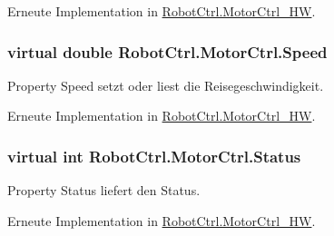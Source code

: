 Erneute Implementation in \hyperlink{class_robot_ctrl_1_1_motor_ctrl___h_w_aa5f0c2dd90cf577ef951e58e957976c9}{RobotCtrl.MotorCtrl\_\-HW}.

\hypertarget{class_robot_ctrl_1_1_motor_ctrl_a13a5a1ee7896d0557c58ba617af60029}{
\subsubsection[{Speed}]{\setlength{\rightskip}{0pt plus 5cm}virtual double RobotCtrl.MotorCtrl.Speed}}
\label{class_robot_ctrl_1_1_motor_ctrl_a13a5a1ee7896d0557c58ba617af60029}
Property Speed setzt oder liest die Reisegeschwindigkeit. 

Erneute Implementation in \hyperlink{class_robot_ctrl_1_1_motor_ctrl___h_w_a037b7d7d65571c8eda634bef767a1870}{RobotCtrl.MotorCtrl\_\-HW}.

\hypertarget{class_robot_ctrl_1_1_motor_ctrl_ac0f2ebafce89738ca669eaa920a30c80}{
\subsubsection[{Status}]{\setlength{\rightskip}{0pt plus 5cm}virtual int RobotCtrl.MotorCtrl.Status}}
\label{class_robot_ctrl_1_1_motor_ctrl_ac0f2ebafce89738ca669eaa920a30c80}
Property Status liefert den Status. 

Erneute Implementation in \hyperlink{class_robot_ctrl_1_1_motor_ctrl___h_w_a0c39f88363e68b382cf946f37fe98e16}{RobotCtrl.MotorCtrl\_\-HW}.

